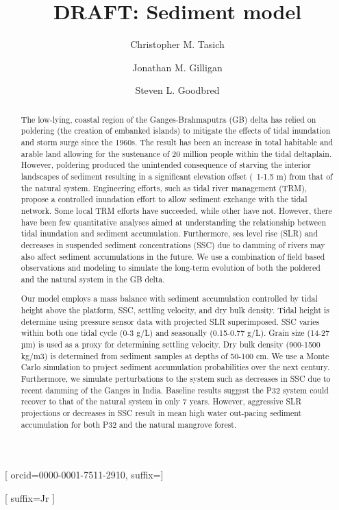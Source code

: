 \documentclass[a4paper,fleqn]{cas-dc}
\begin{document}
\let\WriteBookmarks\relax
\def\floatpagepagefraction{1}
\def\textpagefraction{.001}

\title [mode = title]{DRAFT: Sediment model}

\author{Christopher M. Tasich}[%
orcid=0000-0001-7511-2910,
suffix=]
\cormark[1]

\address{Department of Earth \& Environmental Sciences, Vanderbilt University, Nashville TN 37235, USA}

\author{Jonathan M. Gilligan}
\cormark[2]

\author{Steven L. Goodbred}[%
suffix=Jr
]

\begin{abstract}
  The low-lying, coastal region of the Ganges-Brahmaputra (GB) delta has relied on poldering (the creation of embanked islands) to mitigate the effects of tidal inundation and storm surge since the 1960s. The result has been an increase in total habitable and arable land allowing for the sustenance of 20 million people within the tidal deltaplain. However, poldering produced the unintended consequence of starving the interior landscapes of sediment resulting in a significant elevation offset (~1-1.5 m) from that of the natural system. Engineering efforts, such as tidal river management (TRM), propose a controlled inundation effort to allow sediment exchange with the tidal network. Some local TRM efforts have succeeded, while other have not. However, there have been few quantitative analyses aimed at understanding the relationship between tidal inundation and sediment accumulation.  Furthermore, sea level rise (SLR) and decreases in suspended sediment concentrations (SSC) due to damming of rivers may also affect sediment accumulations in the future. We use a combination of field based observations and modeling to simulate the long-term evolution of both the poldered and the natural system in the GB delta.

  Our model employs a mass balance with sediment accumulation controlled by tidal height above the platform, SSC, settling velocity, and dry bulk density. Tidal height is determine using pressure sensor data with projected SLR superimposed. SSC varies within both one tidal cycle (0-3 g/L) and seasonally (0.15-0.77 g/L). Grain size (14-27 µm) is used as a proxy for determining settling velocity. Dry bulk density (900-1500 kg/m3) is determined from sediment samples at depths of 50-100 cm. We use a Monte Carlo simulation to project sediment accumulation probabilities over the next century. Furthermore, we simulate perturbations to the system such as decreases in SSC due to recent damming of the Ganges in India. Baseline results suggest the P32 system could recover to that of the natural system in only 7 years. However, aggressive SLR projections or decreases in SSC result in mean high water out-pacing sediment accumulation for both P32 and the natural mangrove forest.
\end{abstract}
\end{document}
